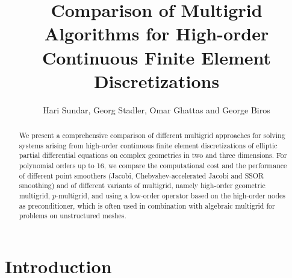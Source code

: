 \documentclass[smallcondensed,final]{svjour3}     %
\begin{document}

\title{Comparison of Multigrid Algorithms for High-order
  Continuous Finite Element Discretizations}

\author{Hari Sundar, Georg Stadler, Omar Ghattas and George Biros}


\maketitle


%
\begin{abstract}
We present a comprehensive comparison of different multigrid approaches for
solving systems arising from high-order continuous finite element
discretizations of elliptic partial differential equations on complex
geometries in two and three dimensions.  For polynomial orders up to 16, we
compare the computational cost and the performance of different point smoothers
(Jacobi, Chebyshev-accelerated Jacobi and SSOR smoothing) and of different
variants of multigrid, namely high-order geometric multigrid, $p$-multigrid,
and using a low-order operator based on the high-order nodes as preconditioner,
which is often used in combination with algebraic multigrid for problems on
unstructured meshes.
\end{abstract}


\section{Introduction}
\end{document}
